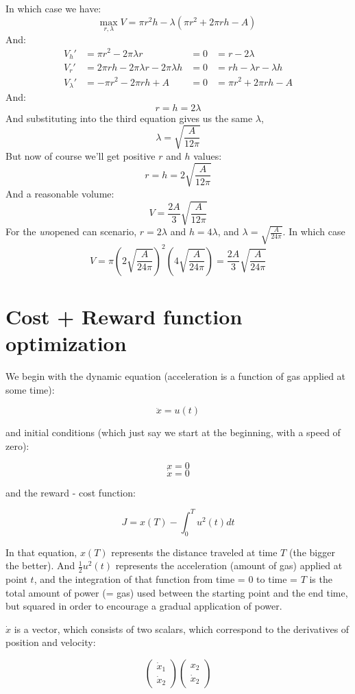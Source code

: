 \documentclass[11pt]{report}
\begin{document}
In which case we have:
\[ \underset{r,\lambda}{\text{max}}\;V = \pi r^2h - \lambda(\pi r^2 + 2\pi rh - A) \]
And:
\begin{align*}
  V_h' &= \pi r^2 - 2\pi\lambda r                 &= 0 &= r - 2\lambda \\
  V_r' &= 2\pi rh - 2\pi\lambda r - 2\pi\lambda h &= 0 &= rh - \lambda r - \lambda h \\
  V_\lambda' &= - \pi r^2 - 2\pi rh + A           &= 0 &= \pi r^2 + 2\pi rh - A
\end{align*}
And:
\[ r = h = 2\lambda \]
And substituting into the third equation gives us the same $\lambda$,
\[ \lambda = \sqrt{\frac{A}{12\pi}} \]
But now of course we'll get positive $r$ and $h$ values:
\[ r = h = 2\sqrt{\frac{A}{12\pi}} \]
And a reasonable volume:
\[ V = \frac{2A}{3}\sqrt{\frac{A}{12\pi}} \]
For the \emph{un}opened can scenario, $r = 2\lambda$ and $h = 4\lambda$, and $\lambda = \sqrt{\frac{A}{24\pi}}$.
In which case
\[ V = 
      \pi \left(2\sqrt{\frac{A}{24\pi}}\right)^2 \left(4\sqrt{\frac{A}{24\pi}}\right) =
      \frac{2A}{3}\sqrt{\frac{A}{24\pi}}
 \]









\section{Cost + Reward function optimization}

We begin with the dynamic equation (acceleration is a function of gas applied at some time):

\[ \ddot{x} = u(t) \]

and initial conditions (which just say we start at the beginning, with a speed of zero):

\[ x = 0 \]
\[ \dot{x} = 0 \]

and the reward - cost function:

\[ J = x(T) -  \int^T_0 u^2(t) dt \]

In that equation, $x(T)$ represents the distance traveled at time $T$ (the bigger the better). And $\frac{1}{2} u^2(t)$ represents the acceleration (amount of gas) applied at point $t$, and the integration of that function from time = 0 to time = $T$ is the total amount of power (= gas) used between the starting point and the end time, but squared in order to encourage a gradual application of power.

$\dot{x}$ is a vector, which consists of two scalars, which correspond to the derivatives of position and velocity:

\[
  \begin{pmatrix}
    \dot{x}_1\\
    \dot{x}_2
  \end{pmatrix}
  \begin{pmatrix}
    x_2\\
    \dot{x}_2
  \end{pmatrix}
\]
\end{document}

